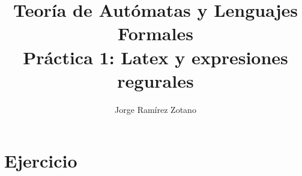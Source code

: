 \documentclass[a4paper]{article}
\title{Teoría de Autómatas y Lenguajes Formales\\[.4\baselineskip]Práctica 1: Latex y expresiones regurales}
\author{Jorge Ramírez Zotano}
\begin{document}
\maketitle
                                                                                                                                
\section{Ejercicio }
\end{document}
